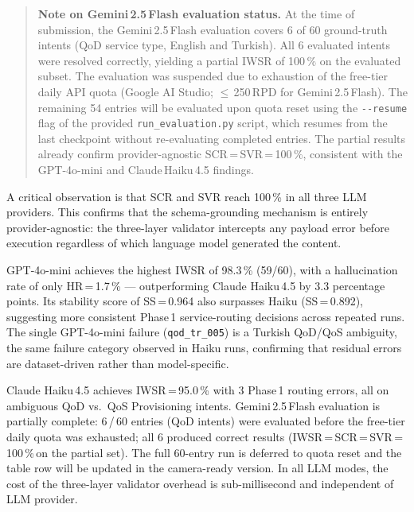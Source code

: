\documentclass[conference]{IEEEtran}
\begin{document}
\begin{quote}
\small
\textbf{Note on Gemini\,2.5\,Flash evaluation status.}\;
At the time of submission, the Gemini\,2.5\,Flash evaluation covers
6 of 60 ground-truth intents (QoD service type, English and Turkish).
All 6 evaluated intents were resolved correctly, yielding a partial
IWSR of 100\,\% on the evaluated subset.
The evaluation was suspended due to exhaustion of the free-tier
daily API quota (Google AI Studio; $\leq$\,250\,RPD for Gemini\,2.5\,Flash).
The remaining 54 entries will be evaluated upon quota reset using
the \verb|--resume| flag of the provided \texttt{run\_evaluation.py} script,
which resumes from the last checkpoint without re-evaluating completed entries.
The partial results already confirm provider-agnostic
SCR\,=\,SVR\,=\,100\,\%, consistent with the GPT-4o-mini and
Claude\,Haiku\,4.5 findings.
\end{quote}

A critical observation is that SCR and SVR reach 100\,\% in all three
LLM providers. This confirms that the schema-grounding mechanism is
entirely provider-agnostic: the three-layer validator intercepts any
payload error before execution regardless of which language model
generated the content.

GPT-4o-mini achieves the highest IWSR of 98.3\,\% (59/60), with a
hallucination rate of only HR\,=\,1.7\,\% --- outperforming Claude
Haiku\,4.5 by 3.3 percentage points.
Its stability score of SS\,=\,0.964 also surpasses Haiku (SS\,=\,0.892),
suggesting more consistent Phase\,1 service-routing decisions across
repeated runs.
The single GPT-4o-mini failure (\texttt{qod\_tr\_005}) is a Turkish
QoD/QoS ambiguity, the same failure category observed in Haiku runs,
confirming that residual errors are dataset-driven rather than
model-specific.

Claude Haiku\,4.5 achieves IWSR\,=\,95.0\,\% with 3 Phase\,1 routing
errors, all on ambiguous QoD vs.\ QoS Provisioning intents.
Gemini\,2.5\,Flash evaluation is partially complete:
6\,/\,60 entries (QoD intents) were evaluated before the
free-tier daily quota was exhausted; all 6 produced correct results
(IWSR\,=\,SCR\,=\,SVR\,=\,100\,\%\,on the partial set).
The full 60-entry run is deferred to quota reset and the table row
will be updated in the camera-ready version.
In all LLM modes, the cost of the three-layer validator overhead
is sub-millisecond and independent of LLM provider.

\end{document}

